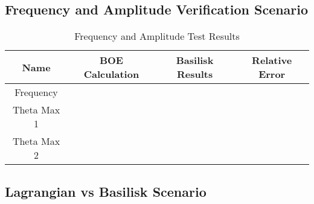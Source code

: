\subsection{Frequency and Amplitude Verification Scenario}
\begin{table}[htbp]
	\caption{Frequency and Amplitude Test Results}
	\label{tab:freqAmpResults}
	\centering \fontsize{10}{10}\selectfont
	\begin{tabular}{| c | c | c | c |} %
		\hline
		\textbf{Name}  & \textbf{BOE Calculation}  & \textbf{Basilisk Results} & \textbf{Relative Error} \\
		\hline
		Frequency  &  \\
		\hline
		Theta Max 1 &  \\
		\hline
		Theta Max 2 &  \\
		\hline
	\end{tabular}
\end{table}


\subsection{Lagrangian vs Basilisk Scenario}





\clearpage
